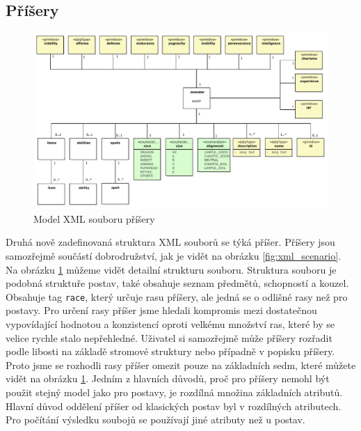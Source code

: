\documentclass[thesis=B,czech]{resources/FITthesis}[2012/06/26]
\begin{document}
\subsection{Příšery}
\begin{figure}\centering
	\includegraphics[width=1\textwidth]{images/monsterXML}
	\caption[Model XML souboru příšery]{Model XML souboru příšery}\label{fig:xml_monster}
\end{figure}
Druhá nově zadefinovaná struktura XML souborů se týká příšer. Příšery jsou samozřejmě součástí dobrodružství, jak je vidět na obrázku \ref{fig:xml_scenario}. Na obrázku \ref{fig:xml_monster} můžeme vidět detailní strukturu souboru. Struktura souboru je podobná struktuře postav, také obsahuje seznam předmětů, schopností a kouzel. Obsahuje tag \texttt{race}, který určuje rasu příšery, ale jedná se o odlišné rasy než pro postavy. Pro určení rasy příšer jsme hledali kompromis mezi dostatečnou vypovídající hodnotou a konzistencí oproti velkému množství ras, které by se velice rychle stalo nepřehledné. Uživatel si samozřejmě může příšery rozřadit podle libosti na základě stromové struktury nebo případně v popisku příšery. Proto jsme se rozhodli rasy příšer omezit pouze na základních sedm, které můžete vidět na obrázku \ref{fig:xml_monster}. Jedním z hlavních důvodů, proč pro příšery nemohl být použit stejný model jako pro postavy, je rozdílná množina základních atributů. Hlavní důvod oddělení příšer od klasických postav byl v rozdílných atributech. Pro počítání výsledku soubojů se používají jiné atributy než u postav. 
\end{document}
